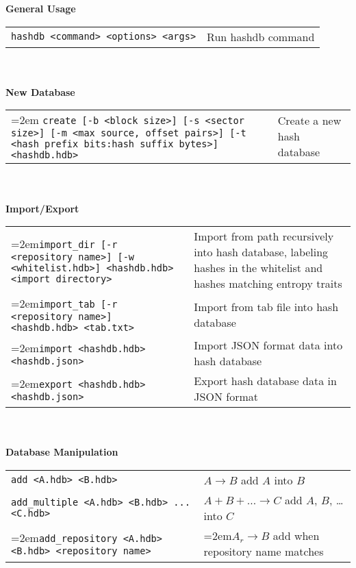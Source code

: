 \begin{footnotesize}
\textbf{General Usage} \\
\begin{tabular}{p{3.6 in} p{3.0 in}}
\texttt{hashdb <command> <options> <args>} & Run hashdb command \\
\end{tabular}
\\
\\
\textbf{New Database} \\
\begin{tabular}{p{3.6 in} p{3.0 in}}
\hangindent=2em \texttt{create [-b <block size>] [-s <sector size>] [-m <max source, offset pairs>] [-t <hash prefix bits:hash suffix bytes>] <hashdb.hdb>} &
Create a new hash database \\
\end{tabular}
\\
\\
\textbf{Import/Export} \\
\begin{tabular}{p{3.6 in} p{3.0 in}}
\hangindent=2em\texttt{import\_dir [-r <repository name>] [-w <whitelist.hdb>] <hashdb.hdb> <import directory>} &
Import from path recursively into hash database, labeling hashes in the whitelist and hashes matching entropy traits \\
\hangindent=2em\texttt{import\_tab [-r <repository name>] <hashdb.hdb> <tab.txt>} &
Import from tab file into hash database \\
\hangindent=2em\texttt{import <hashdb.hdb> <hashdb.json>} &
Import JSON format data into hash database \\
\hangindent=2em\texttt{export <hashdb.hdb> <hashdb.json>} &
Export hash database data in JSON format \\
\end{tabular}
\\
\\
\textbf{Database Manipulation} \\
\begin{tabular}{p{3.6 in} p{3.0 in}}
\texttt{add <A.hdb> <B.hdb>} & $A \rightarrow B$ add $A$ into $B$ \\
\texttt{add\_multiple <A.hdb> <B.hdb> ... <C.hdb>} & $A + B + \ldots \rightarrow C$ add $A$, $B$, \ldots into $C$\\
\hangindent=2em\texttt{add\_repository <A.hdb> <B.hdb> <repository name>} & \hangindent=2em$A_r \rightarrow B$ add when repository name matches \\

\end{tabular}
\end{footnotesize}
